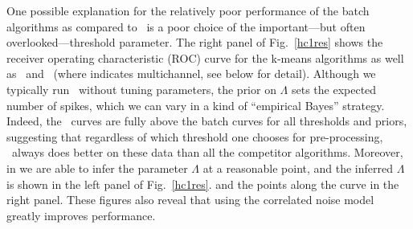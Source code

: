 One possible explanation for the relatively poor performance of the batch algorithms as compared to \smug\ is a poor choice of the important---but often overlooked---threshold parameter.  The right panel of Fig.\ \ref{hc1res} shows the receiver operating characteristic (ROC) curve for the k-means algorithms as well as \smug\ and \smug\ (where  indicates multichannel, see below for detail).  Although we typically run \smug\ without tuning parameters, the prior on $\Lambda$ sets the expected number of spikes, which we can vary in a kind of ``empirical Bayes'' strategy.  Indeed, the \smug\ curves are fully above the batch curves for all thresholds and priors, suggesting that regardless of which threshold one chooses for pre-processing, \smug\ always does better on these data than all the competitor algorithms.  Moreover, in \smug we are able to infer the parameter $\Lambda$ at a reasonable point, and the inferred $\Lambda$ is shown in the left panel of Fig.\ \ref{hc1res}. and the points along the curve in the right panel.  These figures also reveal that using the correlated noise model greatly improves performance.

